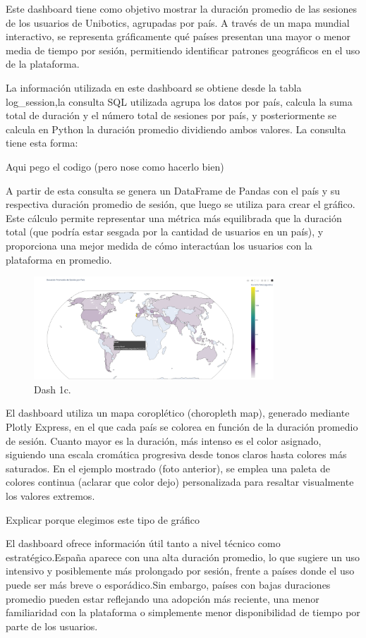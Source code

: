 \documentclass[a4paper, 12pt]{book}
\begin{document}
Este dashboard tiene como objetivo mostrar la duración promedio de las sesiones de los usuarios de Unibotics, agrupadas por país. A través de un mapa mundial interactivo, se representa gráficamente qué países presentan una mayor o menor media de tiempo por sesión, permitiendo identificar patrones geográficos en el uso de la plataforma.

La información utilizada en este dashboard se obtiene desde la tabla log\_session,la consulta SQL utilizada agrupa los datos por país, calcula la suma total de duración y el número total de sesiones por país, y posteriormente se calcula en Python la duración promedio dividiendo ambos valores. La consulta tiene esta forma:

Aqui pego el codigo (pero nose como hacerlo bien)

A partir de esta consulta se genera un DataFrame de Pandas con el país y su respectiva duración promedio de sesión, que luego se utiliza para crear el gráfico. Este cálculo permite representar una métrica más equilibrada que la duración total (que podría estar sesgada por la cantidad de usuarios en un país), y proporciona una mejor medida de cómo interactúan los usuarios con la plataforma en promedio.

\begin{figure}
  \centering
  \includegraphics[width=9cm, keepaspectratio]{img/1c.png}
  \caption{Dash 1c.}\label{fig:1c}
\end{figure}

El dashboard utiliza un mapa coroplético (choropleth map), generado mediante Plotly Express, en el que cada país se colorea en función de la duración promedio de sesión. Cuanto mayor es la duración, más intenso es el color asignado, siguiendo una escala cromática progresiva desde tonos claros hasta colores más saturados. En el ejemplo mostrado (foto anterior), se emplea una paleta de colores continua (aclarar que color dejo) personalizada para resaltar visualmente los valores extremos.

Explicar porque elegimos este tipo de gráfico

El dashboard ofrece información útil tanto a nivel técnico como estratégico.España aparece con una alta duración promedio, lo que sugiere un uso intensivo y posiblemente más prolongado por sesión, frente a países donde el uso puede ser más breve o esporádico.Sin embargo, países con bajas duraciones promedio pueden estar reflejando una adopción más reciente, una menor familiaridad con la plataforma o simplemente menor disponibilidad de tiempo por parte de los usuarios.
\end{document}

